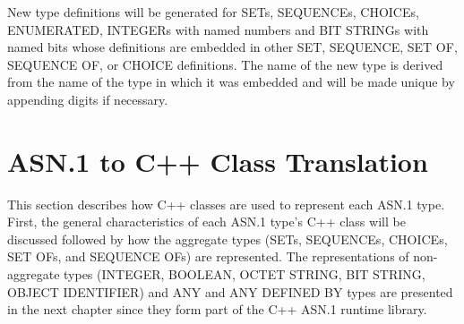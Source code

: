 New type definitions will be generated for SETs, SEQUENCEs, CHOICEs,
ENUMERATED, INTEGERs with named numbers and BIT STRINGs with named bits
whose definitions are embedded in other SET, SEQUENCE, SET OF,
SEQUENCE OF, or CHOICE definitions.  The name of the new type
is derived from the name of the type in which it was embedded and will
be made unique by appending digits if necessary.

\section{\label{type-gen-C++-section}ASN.1 to C++ Class Translation}

This section describes how C++ classes are used to represent each
ASN.1 type.  First, the general characteristics of each ASN.1 type's
C++ class will be discussed followed by how the aggregate types (SETs,
SEQUENCEs, CHOICEs, SET OFs, and SEQUENCE OFs) are represented.  The
representations of non-aggregate types (INTEGER, BOOLEAN, OCTET
STRING, BIT STRING, OBJECT IDENTIFIER) and ANY and ANY DEFINED BY
types are presented in the next chapter since they form part of the
C++ ASN.1 runtime library.

